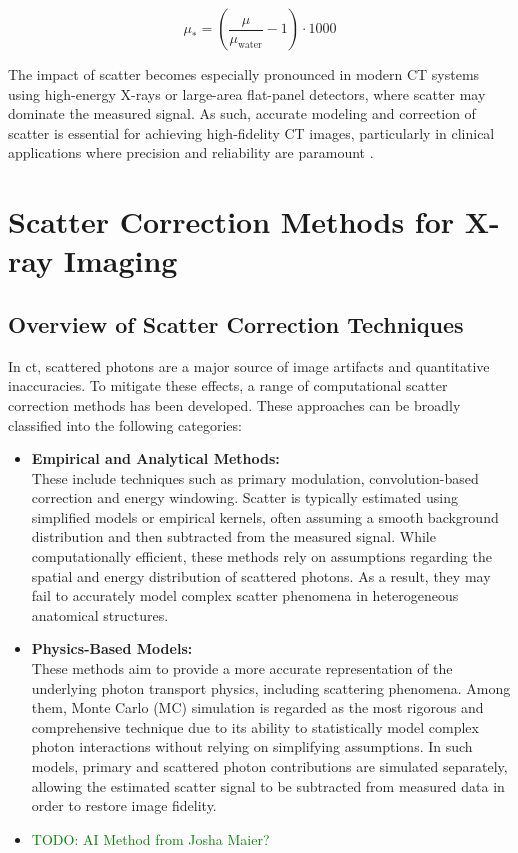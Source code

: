 $$\mu_* = \left(\frac{\mu}{\mu_{\text{water}}} -1\right) \cdot 1000$$

The impact of scatter becomes especially pronounced in modern CT systems using
high-energy X-rays or large-area flat-panel detectors, where scatter may
dominate the measured signal. As such, accurate modeling and correction of
scatter is essential for achieving high-fidelity CT images, particularly in
clinical applications where precision and reliability are paramount
\citep{medicalImagingSystemsIntro2019:}.


\section{Scatter Correction Methods for X-ray Imaging}

\subsection{Overview of Scatter Correction Techniques}

In \ac{ct}, scattered photons are a major source of image artifacts and
quantitative inaccuracies. To mitigate these effects, a range of computational
scatter correction methods has been developed. These approaches can be broadly
classified into the following categories:

\begin{itemize}
    \item \textbf{Empirical and Analytical Methods:} \\
        These include techniques such as primary modulation, convolution-based
        correction and energy windowing. Scatter is typically estimated using
        simplified models or empirical kernels, often assuming a smooth
        background distribution and then subtracted from the measured signal.
        While computationally efficient, these methods rely on assumptions
        regarding the spatial and energy distribution of scattered photons. As a
        result, they may fail to accurately model complex scatter phenomena in
        heterogeneous anatomical structures.
    \item \textbf{Physics-Based Models:} \\
        These methods aim to provide a more accurate representation of the
        underlying photon transport physics, including scattering phenomena.
        Among them, Monte Carlo (MC) simulation is regarded as the most rigorous
        and comprehensive technique due to its ability to statistically model
        complex photon interactions without relying on simplifying assumptions.
        In such models, primary and scattered photon contributions are simulated
        separately, allowing the estimated scatter signal to be subtracted from
        measured data in order to restore image fidelity.
    \item \textcolor{green}{TODO: AI Method from Josha Maier?}
\end{itemize}

